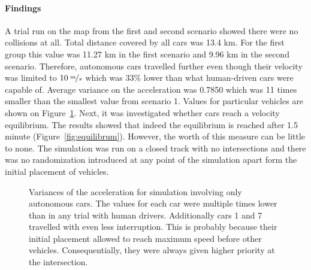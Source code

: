 \documentclass[11pt,english]{article}
\begin{document}
\paragraph{Findings}

A trial run on the map from the first and second scenario showed there were no collisions at all. Total distance covered by all cars was 13.4 km. For the first group this value was 11.27 km in the first scenario and 9.96 km in the second scenario. Therefore, autonomous cars travelled further even though their velocity was limited to $10\:\nicefrac{m}{s}$ which was 33\% lower than what human-driven cars were capable of. Average variance on the acceleration was 0.7850 which was 11 times smaller than the smallest value from scenario 1. Values for particular vehicles are shown on Figure~\ref{fig:acc_autonomous_only_var}. Next, it was investigated whether cars reach a velocity equilibrium. The results showed that indeed the equilibrium is reached after 1.5 minute (Figure~\ref{fig:equilibrum}). However, the worth of this measure can be little to none. The simulation was run on a closed track with no intersections and there was no randomization introduced at any point of the simulation apart form the initial placement of vehicles.


\begin{figure}[!] %
\caption{Variances of the acceleration for simulation involving only autonomous cars. The values for each car were multiple times lower than in any trial with human drivers. Additionally cars 1 and 7 travelled with even less interruption. This is probably because their initial placement allowed to reach maximum speed before other vehicles. Consequentially, they were always given higher priority at the intersection.}
\label{fig:acc_autonomous_only_var}
\end{figure} 
\end{document}
